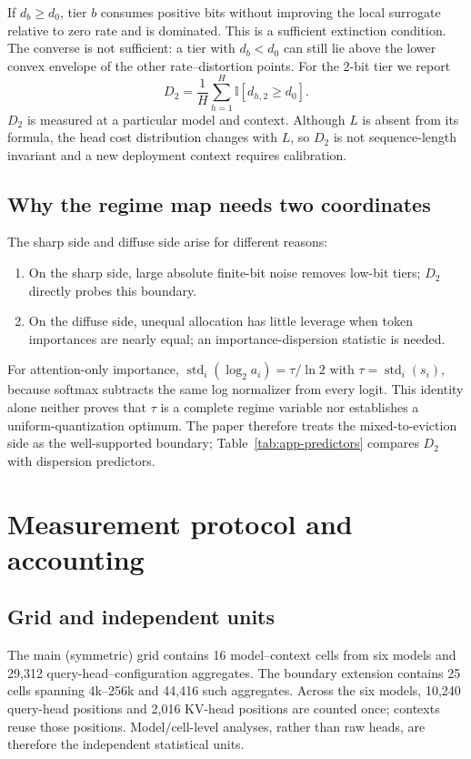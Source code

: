 If $d_b\ge d_0$, tier $b$ consumes positive bits without improving the local
surrogate relative to zero rate and is dominated.  This is a sufficient
extinction condition.  The converse is not sufficient: a tier with $d_b<d_0$
can still lie above the lower convex envelope of the other rate--distortion
points.  For the 2-bit tier we report
\[
 D_2=\frac1H\sum_{h=1}^{H}\mathbb I[d_{h,2}\ge d_0].
\]
$D_2$ is measured at a particular model and context.  Although $L$ is absent
from its formula, the head cost distribution changes with $L$, so $D_2$ is not
sequence-length invariant and a new deployment context requires calibration.

\subsection{Why the regime map needs two coordinates}

The sharp side and diffuse side arise for different reasons:
\begin{enumerate}
 \item On the sharp side, large absolute finite-bit noise removes low-bit tiers;
 $D_2$ directly probes this boundary.
 \item On the diffuse side, unequal allocation has little leverage when token
 importances are nearly equal; an importance-dispersion statistic is needed.
\end{enumerate}
For attention-only importance,
$\operatorname{std}_i(\log_2 a_i)=\tau/\ln2$ with $\tau=\operatorname{std}_i(s_i)$,
because softmax subtracts the same log normalizer from every logit.  This
identity alone neither proves that $\tau$ is a complete regime variable nor
establishes a uniform-quantization optimum.  The paper therefore treats the
mixed-to-eviction side as the well-supported boundary;
Table~\ref{tab:app-predictors} compares $D_2$ with dispersion predictors.

\section{Measurement protocol and accounting}
\label{app:protocol}

\subsection{Grid and independent units}

The main (symmetric) grid contains 16 model--context cells from six models and
29,312 query-head--configuration aggregates.  The boundary extension contains
25 cells spanning 4k--256k and 44,416 such aggregates.  Across the six models,
10,240 query-head positions and 2,016 KV-head positions are counted once;
contexts reuse those positions.  Model/cell-level analyses, rather than raw
heads, are therefore the independent statistical units.

